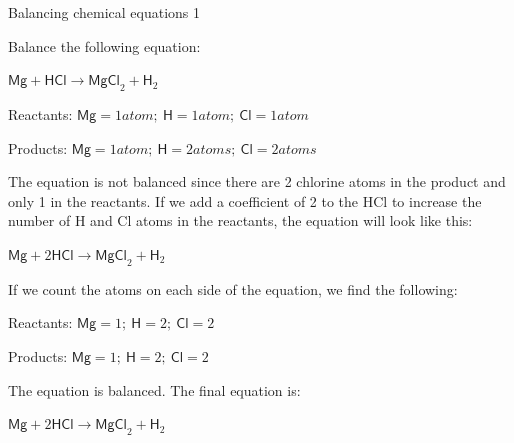 \begin{wex}{Balancing chemical equations 1}{Balance the following equation:
\begin{center}
${\mathsf{Mg} + \mathsf{HCl} \rightarrow \mathsf{MgCl}_{2} + \mathsf{H}_{2}}$\\
\end{center}
}

{

Reactants: $\mathsf{Mg} = 1 atom;~ \mathsf{H} = 1 atom;~ \mathsf{Cl} = 1 atom$

Products: $\mathsf{Mg} = 1 atom;~ \mathsf{H} = 2 atoms;~ \mathsf{Cl} = 2 atoms$}

{
The equation is not balanced since there are 2 chlorine atoms in the product and only 1 in the reactants. If we add a coefficient of 2 to the HCl to increase the number of H and Cl atoms in the reactants, the equation will look like this:
\begin{center}
${\mathsf{Mg} + 2\mathsf{HCl} \rightarrow \mathsf{MgCl}_{2} + \mathsf{H}_{2}}$\\
\end{center}
}

{
If we count the atoms on each side of the equation, we find the following:

Reactants: $\mathsf{Mg} = 1;~ \mathsf{H} = 2;~ \mathsf{Cl} = 2$

Products: $\mathsf{Mg} = 1;~ \mathsf{H} = 2;~ \mathsf{Cl} = 2$

The equation is balanced. The final equation is:
\begin{center}
${\mathsf{Mg} + 2\mathsf{HCl} \rightarrow \mathsf{MgCl}_{2} + \mathsf{H}_{2}}$
\end{center}
}
\end{wex}
    \noindent
\par
            \label{m38726*secfhsst!!!underscore!!!id394}\vspace{.5cm} 
      \noindent
